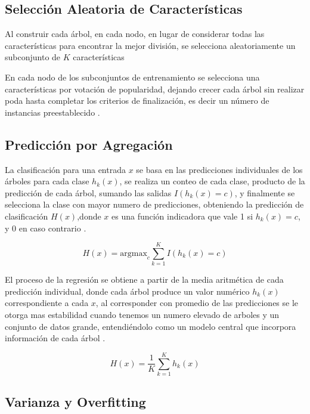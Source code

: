 		\subsection{Selección Aleatoria de Características}
			
			Al construir cada árbol, en cada nodo, en lugar de considerar todas las características para encontrar la mejor división, se selecciona aleatoriamente un subconjunto de $K$ características
			
			En cada nodo de los subconjuntos de entrenamiento se selecciona una características por votación de popularidad, dejando crecer cada árbol sin realizar poda hasta completar los criterios de finalización, es decir un número de instancias preestablecido \citep{breiman2001}.
			
		\subsection{Predicción por Agregación}
		
			 La clasificación para una entrada $x$ se basa en las predicciones individuales de los árboles para cada clase $h_{k}(x)$, se realiza un conteo de cada clase, producto de la predicción de cada árbol, sumando las salidas $I(h_{k}(x)=c)$, y finalmente se selecciona la clase con mayor numero de predicciones, obteniendo la predicción de clasificación $H(x)$,donde $x$ es una función indicadora que vale 1 si $h_{k}(x)=c$, y $0$ en caso contrario \citep{breiman2001}.
			 
			 \begin{equation}
			 	H(x) = \text{argmax}_c \sum_{k=1}^K I(h_k(x) = c)
			 \end{equation}


			El proceso de la regresión se obtiene a partir de la media aritmética de cada predicción individual, donde cada árbol produce un valor numérico $h_{k}(x)$ correspondiente a cada $x$, al corresponder con promedio de las predicciones se le otorga mas estabilidad cuando tenemos un numero elevado de arboles  y un conjunto de datos grande, entendiéndolo como un modelo central que incorpora información de cada árbol \citep{breiman2001}. 
			
			\begin{equation}
					H(x) = \frac{1}{K} \sum_{k=1}^K h_k(x)	
			\end{equation}

		\subsection{Varianza y Overfitting}
		
